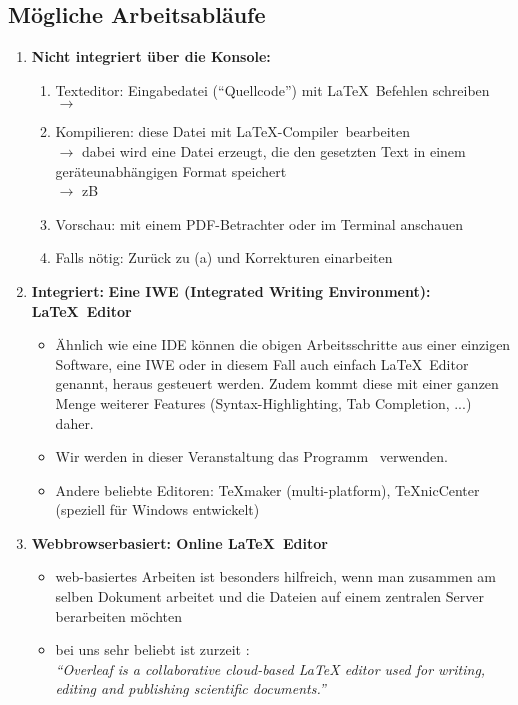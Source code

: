 \subsection{Mögliche Arbeitsabläufe}
\begin{enumerate}
	\item \textbf{Nicht integriert über die Konsole:}
	\begin{enumerate}
		\item Texteditor: Eingabedatei (``Quellcode'') mit \LaTeX~Befehlen schreiben\\ $\to$ 
		\item Kompilieren: diese Datei mit \LaTeX-Compiler~bearbeiten\\
		$\to$ dabei wird eine Datei erzeugt, die den gesetzten Text in einem geräteunabhängigen Format speichert\\
		$\to$ zB 
		\item Vorschau:  mit einem PDF-Betrachter oder im Terminal anschauen
		\item Falls nötig: Zurück zu (a) und Korrekturen einarbeiten
	\end{enumerate}

\item \textbf{Integriert:} \textbf{Eine IWE (Integrated Writing Environment): \LaTeX~Editor}
\begin{itemize}
	\item Ähnlich wie eine IDE können die obigen Arbeitsschritte aus einer einzigen Software, eine IWE oder in diesem Fall auch einfach \LaTeX~Editor genannt, heraus gesteuert werden. Zudem kommt diese mit einer ganzen Menge weiterer Features (Syntax-Highlighting, Tab Completion, ...) daher.
\item Wir werden in dieser Veranstaltung das Programm \texstudio~verwenden.
\item Andere beliebte Editoren: TeXmaker (multi-platform), TeXnicCenter (speziell für Windows entwickelt)
\end{itemize}

\item \textbf{Webbrowserbasiert: Online \LaTeX~Editor}
\begin{itemize}
	\item web-basiertes Arbeiten ist besonders hilfreich, wenn man zusammen am selben Dokument arbeitet und die Dateien auf einem zentralen Server berarbeiten möchten
	\item bei uns sehr beliebt ist zurzeit :\\\textit{``Overleaf is a collaborative cloud-based LaTeX editor used for writing, editing and publishing scientific documents.''}
\end{itemize}
\end{enumerate}


